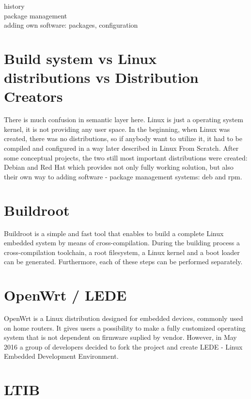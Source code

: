 \documentclass[printmode]{mgr}
\begin{document}



history\\
package management\\
adding own software: packages, configuration\\

\section{Build system vs Linux distributions vs Distribution Creators}
There is much confusion in semantic layer here. Linux is just a operating system kernel, it is not providing any user space.
In the beginning, when Linux was created, there was no distributions, so if anybody want to utilize it, it had to be compiled and configured in a way later described in Linux From Scratch.
After some conceptual projects, the two still most important distributions were created: Debian and Red Hat which provides not only fully working solution, but also their own way to adding software - package management systems: deb and rpm. 

\section{Buildroot}

Buildroot is a simple and fast tool that enables to build a complete Linux embedded system by means of cross-compilation. During the building process a cross-compilation toolchain, a root filesystem, a Linux kernel and a boot loader can be generated.  Furthermore, each of these steps can be performed separately.

\section{OpenWrt / LEDE}

OpenWrt is a Linux distribution designed for embedded devices, commonly used on home routers. It gives users a possibility to make a fully customized operating system that is not dependent on firmware suplied by vendor. However, in May 2016  a group of developers decided to fork the project and create LEDE - Linux Embedded Development Environment.

\section{LTIB}
\end{document}

